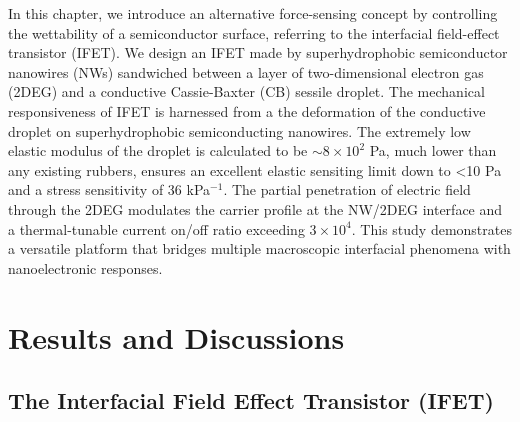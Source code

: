  In this chapter, we introduce an alternative force-sensing concept by
 controlling the wettability of a semiconductor surface, referring to
 the interfacial field-effect transistor (IFET).  We design an IFET
 made by superhydrophobic semiconductor nanowires (NWs) sandwiched
 between a layer of two-dimensional electron gas (2DEG) and a
 conductive Cassie-Baxter (CB) sessile droplet.  The mechanical
 responsiveness of IFET is harnessed from a the deformation of the
 conductive droplet on superhydrophobic semiconducting nanowires. The
 extremely low elastic modulus of the droplet is calculated to be
 $\sim{}8\times{}10^{2}$ Pa, much lower than any existing rubbers,
 ensures an excellent elastic sensiting limit down to \textless{}10 Pa
 and a stress sensitivity of 36 kPa$^{-1}$.
 The partial penetration
 of electric field through the 2DEG modulates the carrier profile at
 the NW/2DEG interface and a thermal-tunable current on/off ratio
 exceeding $3\times{}10^{4}$.
  This study demonstrates a
  versatile platform that bridges multiple macroscopic interfacial
  phenomena with nanoelectronic responses.


\section{Results and Discussions}
\label{sec:small-results-discussions}


\subsection{The Interfacial Field Effect Transistor (IFET)}
\label{sec:small-interf-field-effect}

